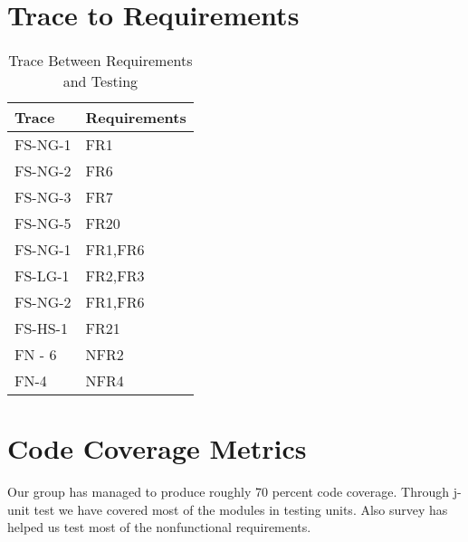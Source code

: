 \documentclass{article}
\begin{document}
\vspace{5mm}


\section{Trace to Requirements}
\begin{table}[h!] 
\centering 
\begin{tabular}{p{} p{}} 
\toprule 
\textbf{Trace} & \textbf{Requirements}\\ 
\midrule 
{FS-NG-1} & FR1 \\
{FS-NG-2} & FR6 \\
{FS-NG-3} & FR7 \\
{FS-NG-5} & FR20 \\
{FS-NG-1} & FR1,FR6 \\
{FS-LG-1} & FR2,FR3 \\
{FS-NG-2} & FR1,FR6 \\
{FS-HS-1} & FR21 \\
{FN - 6} & NFR2 \\
{FN-4} & NFR4 \\
\bottomrule 
\end{tabular} 
\caption{Trace Between Requirements and Testing} 
\label{TblRT}


\section{Code Coverage Metrics}
Our group has managed to produce roughly 70 percent code coverage. Through j-unit test we have covered most of the modules in testing units. Also survey has helped us test most of the nonfunctional requirements.
\end{table}
\end{document}
